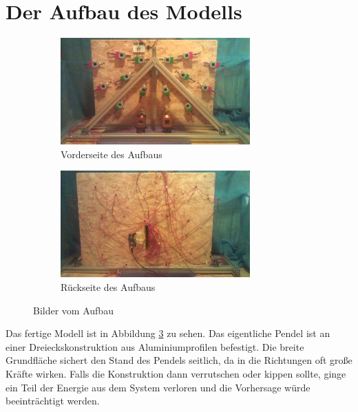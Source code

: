 
\section{Der Aufbau des Modells}

\begin{figure}[bht]
  \centering
  \begin{subfigure}{\textwidth}
    \centering
    \includegraphics[width=0.8\textwidth]{images/real_front.jpg}
    \caption{Vorderseite des Aufbaus}
    \label{fig:front}
  \end{subfigure}
  \begin{subfigure}{\textwidth}
    \centering
    \includegraphics[width=0.8\textwidth]{images/real_back.jpg}
    \caption{Rückseite des Aufbaus}
    \label{fig:back}
  \end{subfigure}
  \caption{Bilder vom Aufbau}
  \label{fig:aufbau}
\end{figure}

Das fertige Modell ist in Abbildung \ref{fig:aufbau} zu sehen.
Das eigentliche Pendel ist an einer Dreieckskonstruktion aus Aluminiumprofilen befestigt.
Die breite Grundfläche sichert den Stand des Pendels seitlich, da in die Richtungen oft große Kräfte wirken.
Falls die Konstruktion dann verrutschen oder kippen sollte, ginge ein Teil der Energie aus dem System verloren und die Vorhersage würde beeinträchtigt werden.

